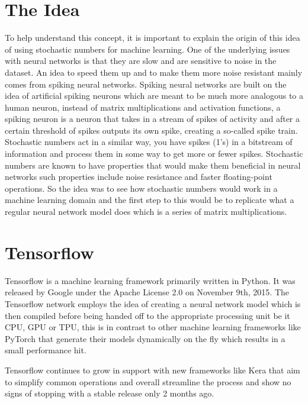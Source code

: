 \documentclass[a4paper,oneside,phd,etd]{BYUPhys}
\begin{document}
\section{The Idea}
To help understand this concept, it is important to explain the origin of this idea of using stochastic numbers for machine learning. One of the underlying issues with neural networks is that they are slow and are sensitive to noise in the dataset. An idea to speed them up and to make them more noise resistant mainly comes from spiking neural networks. Spiking neural networks are built on the idea of artificial spiking neurons which are meant to be much more analogous to a human neuron, instead of matrix multiplications and activation functions, a spiking neuron is a neuron that takes in a stream of spikes of activity and after a certain threshold of spikes outputs its own spike, creating a so-called spike train. Stochastic numbers act in a similar way, you have spikes (1's) in a bitstream of information and process them in some way to get more or fewer spikes. Stochastic numbers are known to have properties that would make them beneficial in neural networks such properties include noise resistance and faster floating-point operations.
So the idea was to see how stochastic numbers would work in a machine learning domain and the first step to this would be to replicate what a regular neural network model does which is a series of matrix multiplications.

\section{Tensorflow}
Tensorflow\cite{tensorflow} is a machine learning framework primarily written in Python. It was released by Google under the Apache License 2.0 on November 9th, 2015. The Tensorflow network employs the idea of creating a neural network model which is then compiled before being handed off to the appropriate processing unit be it CPU, GPU or TPU, this is in contrast to other machine learning frameworks like PyTorch that generate their models dynamically on the fly which results in a small performance hit.

Tensorflow continues to grow in support with new frameworks like Kera that aim to simplify common operations and overall streamline the process and show no signs of stopping with a stable release only 2 months ago.
\end{document}
